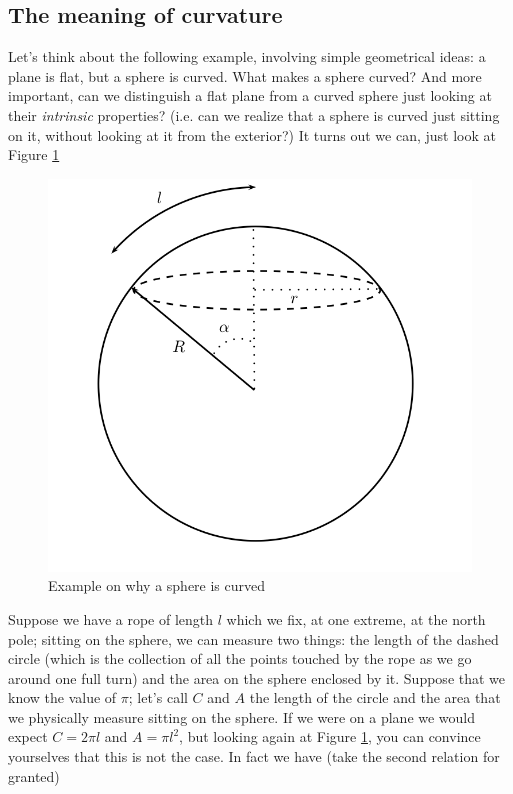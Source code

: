 \subsection{The meaning of curvature}
Let's think about the following example, involving simple geometrical ideas: a plane is flat, but a sphere is curved. What makes a sphere curved? And more important, can we distinguish a flat plane from a curved sphere just looking at their \textit{intrinsic} properties? (i.e. can we realize that a sphere is curved just sitting on it, without looking at it from the exterior?) It turns out we can, just look at Figure \ref{sphere}
\begin{figure}
\begin{center}
\includegraphics[scale=0.7]{Draw/sphere.png}
\end{center}
\caption{Example on why a sphere is curved}
\label{sphere}
\end{figure}
Suppose we have a rope of length $l$ which we fix, at one extreme, at the north pole; sitting on the sphere, we can measure two things: the length of the dashed circle (which is the collection of all the points touched by the rope as we go around one full turn) and the area on the sphere enclosed by it. Suppose that we know the value of $\pi$; let's call $C$ and $A$ the length of the circle and the area that we physically measure sitting on the sphere. If we were on a plane we would expect $C=2\pi l$ and $A=\pi l^2$, but looking again at Figure \ref{sphere}, you can convince yourselves that this is not the case. In fact we have (take the second relation for granted)
